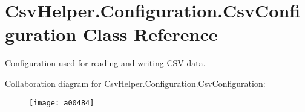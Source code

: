 \hypertarget{a00063}{\section{Csv\-Helper.\-Configuration.\-Csv\-Configuration Class Reference}
\label{a00063}
}


\hyperlink{a00338}{Configuration} used for reading and writing C\-S\-V data.  




Collaboration diagram for Csv\-Helper.\-Configuration.\-Csv\-Configuration\-:
\nopagebreak
\begin{figure}[H]
\begin{center}
\leavevmode
\texttt{[image: a00484]}
\end{center}
\end{figure}
